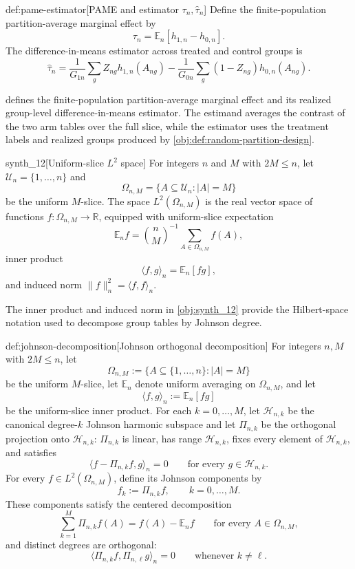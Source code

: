 \begin{definitionv}{def:pame-estimator}[PAME and estimator \(\tau_n,\widehat\tau_n\)]
Define the finite-population partition-average marginal effect by
\[
\tau_n=\mathbb E_n\!\left[h_{1,n}-h_{0,n}\right].
\]
The difference-in-means estimator across treated and control groups is
\[
\widehat\tau_n
=
\frac{1}{G_{1n}}\sum_g Z_{ng}h_{1,n}(A_{ng})
-
\frac{1}{G_{0n}}\sum_g (1-Z_{ng})h_{0,n}(A_{ng}).
\]
\end{definitionv}

 defines the finite-population partition-average marginal effect and its realized group-level difference-in-means estimator. The estimand averages the contrast of the two arm tables over the full slice, while the estimator uses the treatment labels and realized groups produced by \cref{obj:def:random-partition-design}.

\begin{definitionv}{synth_12}[Uniform-slice \(L^2\) space]
For integers \(n\) and \(M\) with \(2M\le n\), let \(\mathcal U_n=\{1,\ldots,n\}\) and
\[
\Omega_{n,M}=\{A\subseteq\mathcal U_n: |A|=M\}
\]
be the uniform \(M\)-slice. The space \(L^2(\Omega_{n,M})\) is the real vector space of functions \(f:\Omega_{n,M}\to\mathbb R\), equipped with uniform-slice expectation
\[
\mathbb E_n f=\binom nM^{-1}\sum_{A\in\Omega_{n,M}} f(A),
\]
inner product
\[
\langle f,g\rangle_n=\mathbb E_n[fg],
\]
and induced norm \(\|f\|_n^2=\langle f,f\rangle_n\).
\end{definitionv}

The inner product  and induced norm  in \cref{obj:synth_12} provide the Hilbert-space notation used to decompose group tables by Johnson degree.

\begin{definitionv}{def:johnson-decomposition}[Johnson orthogonal decomposition]
For integers \(n,M\) with \(2M\le n\), let
\[
\Omega_{n,M}:=\{A\subseteq \{1,\ldots,n\}: |A|=M\}
\]
be the uniform \(M\)-slice, let \(\mathbb E_n\) denote uniform averaging on \(\Omega_{n,M}\), and let
\[
\langle f,g\rangle_n:=\mathbb E_n[fg]
\]
be the uniform-slice inner product. For each \(k=0,\ldots,M\), let \(\mathcal H_{n,k}\) be the canonical degree-\(k\) Johnson harmonic subspace and let \(\Pi_{n,k}\) be the orthogonal projection onto \(\mathcal H_{n,k}\): \(\Pi_{n,k}\) is linear, has range \(\mathcal H_{n,k}\), fixes every element of \(\mathcal H_{n,k}\), and satisfies
\[
\langle f-\Pi_{n,k}f,g\rangle_n=0
\qquad
\text{for every }g\in\mathcal H_{n,k}.
\]
For every \(f\in L^2(\Omega_{n,M})\), define its Johnson components by
\[
f_k:=\Pi_{n,k}f,\qquad k=0,\ldots,M .
\]
These components satisfy the centered decomposition
\[
\sum_{k=1}^M \Pi_{n,k}f(A)=f(A)-\mathbb E_n f
\qquad\text{for every }A\in\Omega_{n,M},
\]
and distinct degrees are orthogonal:
\[
\langle \Pi_{n,k}f,\Pi_{n,\ell}g\rangle_n=0
\qquad\text{whenever }k\ne \ell .
\]
\end{definitionv}

